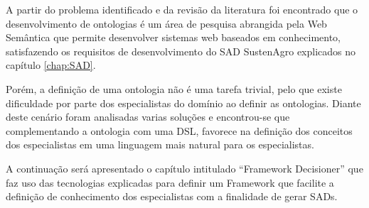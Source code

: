A partir do problema identificado e da revisão da literatura foi encontrado
que o desenvolvimento de ontologias é um área de pesquisa abrangida
pela Web Semântica que permite desenvolver sistemas web baseados em
conhecimento, satisfazendo os requisitos de desenvolvimento do SAD
SustenAgro explicados no capítulo \ref{chap:SAD}.

Porém, a definição de uma ontologia não é uma tarefa trivial, pelo
que existe dificuldade por parte dos especialistas do domínio ao definir
as ontologias. Diante deste cenário foram analisadas varias soluções
e encontrou-se que complementando a ontologia com uma DSL, favorece
na definição dos conceitos dos especialistas em uma linguagem mais
natural para os especialistas.

A continuação será apresentado o capítulo intitulado ``Framework
Decisioner'' que faz uso das tecnologias explicadas para definir
um Framework que facilite a definição de conhecimento dos especialistas
com a finalidade de gerar SADs.
